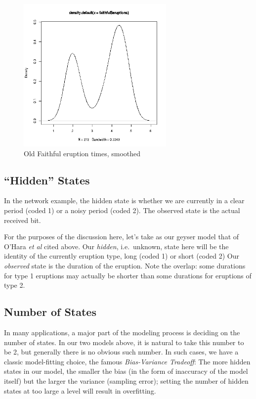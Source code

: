 \documentclass[11pt]{article}
\begin{document}
\begin{figure}[tb]
\centerline{
\includegraphics[width=3.0in]{FaithfulDurationSmooth.png}
}
\caption{Old Faithful eruption times, smoothed}
\label{faithfulhistsmooth}
\end{figure}

\subsection{``Hidden'' States}

In the network example, the hidden state is whether we are currently in
a clear period (coded 1) or a noisy period (coded 2).  The observed
state is the actual received bit.

For the purposes of the discussion here, let's take as our geyser model
that of O'Hara \textit{et al} cited above.  Our \textit{hidden}, i.e.\
unknown, state here will be the identity of the currently eruption type,
long (coded 1) or short (coded 2) Our \textit{observed} state is the
duration of the eruption.  Note the overlap: some durations
for type 1 eruptions may actually be shorter than some durations
for eruptions of type 2.

\subsection{Number of States}

In many applications, a major part of the modeling process is deciding
on the number of states.  In our two models above, it is natural to take
this number to be 2, but generally there is no obvious such number.  In
such cases, we have a classic model-fitting choice, the famous
\textit{Bias-Variance Tradeoff}:  The more hidden states in our model,
the smaller the bias (in the form of inaccuracy of the model itself) but
the larger the variance (sampling error); setting the number of hidden
states at too large a level will result in overfitting.
\end{document}
